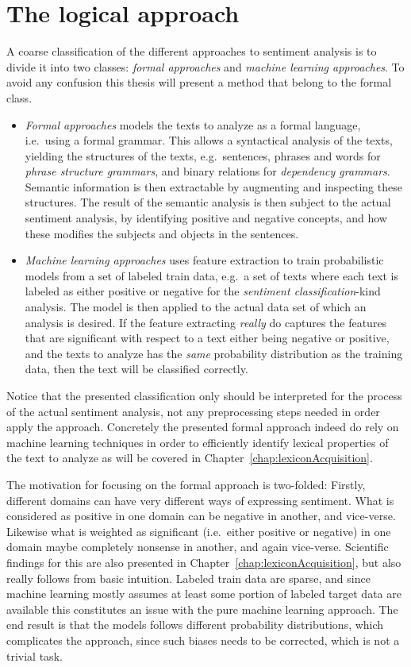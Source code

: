 \section{The logical approach}
\label{sec:logicalApproach}
A coarse classification of the different approaches to sentiment analysis is to divide it into two classes: \emph{formal approaches} and \emph{machine learning approaches}. To avoid any confusion this thesis will present a method that belong to the formal class. 
\begin{itemize}
	\item \textit{Formal approaches} models the texts to analyze as a formal language, i.e.\ using a formal grammar. This allows a syntactical analysis of the texts, yielding the structures of the texts, e.g.\ sentences, phrases and words for \emph{phrase structure grammars}, and binary relations for \emph{dependency grammars}. Semantic information is then extractable by augmenting and inspecting these structures. The result of the semantic analysis is then subject to the actual sentiment analysis, by identifying positive and negative concepts, and how these modifies the subjects and objects in the sentences.

	\item \textit{Machine learning approaches} uses feature extraction to train probabilistic models from a set of labeled train data, e.g.\ a set of texts where each text is labeled as either positive or negative for the \emph{sentiment classification}-kind analysis. The model is then applied to the actual data set of which an analysis is desired. If the feature extracting \emph{really} do captures the features that are significant with respect to a text either being negative or positive, and the texts to analyze has the \emph{same} probability distribution as the training data, then the text will be classified correctly.
\end{itemize}

Notice that the presented classification only should be interpreted for the process of the actual sentiment analysis, not any preprocessing steps needed in order apply the approach. Concretely the presented formal approach indeed do rely on machine learning techniques in order to efficiently identify lexical properties of the text to analyze as will be covered in Chapter~\ref{chap:lexiconAcquisition}.

The motivation for focusing on the formal approach is two-folded: Firstly, different domains can have very different ways of expressing sentiment. What is considered as positive in one domain can be negative in another, and vice-verse. Likewise what is weighted as significant (i.e.\ either positive or negative) in one domain maybe completely nonsense in another, and again vice-verse. Scientific findings for this are also presented in Chapter~\ref{chap:lexiconAcquisition}, but also really follows from basic intuition. Labeled train data are sparse, and since machine learning mostly assumes at least some portion of labeled target data are available this constitutes an issue with the pure machine learning approach. The end result is that the models follows different probability distributions, which complicates the approach, since such biases needs to be corrected, which is not a trivial task.

